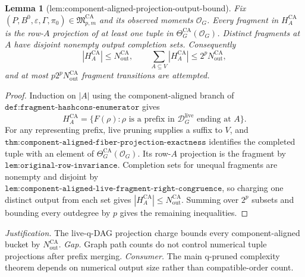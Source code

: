 \documentclass{article}
\newtheorem{lemma}{Lemma}
\begin{document}
\begin{lemma}[lem:component-aligned-projection-output-bound]\label{lem:component-aligned-projection-output-bound}
Fix \((P,B^0,\varepsilon,\Gamma,\pi_0)\in\mathfrak M_{p,m}^{\mathrm{CA}}\) and its observed moments \(\mathcal O_G\).  Every fragment in \(H_A^{\mathrm{CA}}\) is the row-\(A\) projection of at least one tuple in \(\Theta_G^{\mathrm{CA}}(\mathcal O_G)\).  Distinct fragments at \(A\) have disjoint nonempty output completion sets.  Consequently
\[
 |H_A^{\mathrm{CA}}|\le N_{\mathrm{out}}^{\mathrm{CA}},
 \qquad
 \sum_{A\subseteq V}|H_A^{\mathrm{CA}}|
 \le2^pN_{\mathrm{out}}^{\mathrm{CA}},
\]
and at most \(p2^pN_{\mathrm{out}}^{\mathrm{CA}}\) fragment transitions are attempted.
\end{lemma}
\begin{proof}
Induction on \(|A|\) using the component-aligned branch of \(\texttt{def:fragment-hashcons-enumerator}\) gives
\[
 H_A^{\mathrm{CA}}
 =\{F(\rho):\rho\text{ is a prefix in }
 \mathcal D_G^{\mathrm{live}}\text{ ending at }A\}.
\]
For any representing prefix, live pruning supplies a suffix to \(V\), and \(\texttt{thm:component-aligned-fiber-projection-exactness}\) identifies the completed tuple with an element of \(\Theta_G^{\mathrm{CA}}(\mathcal O_G)\).  Its row-\(A\) projection is the fragment by \(\texttt{lem:original-row-invariance}\).  Completion sets for unequal fragments are nonempty and disjoint by \(\texttt{lem:component-aligned-live-fragment-right-congruence}\), so charging one distinct output from each set gives \(|H_A^{\mathrm{CA}}|\le N_{\mathrm{out}}^{\mathrm{CA}}\).  Summing over \(2^p\) subsets and bounding every outdegree by \(p\) gives the remaining inequalities.
\end{proof}
\par\smallskip\noindent \textit{Justification.} The live-q-DAG projection charge bounds every component-aligned bucket by \(N_{\mathrm{out}}^{\mathrm{CA}}\). \textit{Gap.} Graph path counts do not control numerical tuple projections after prefix merging. \textit{Consumer.} The main q-pruned complexity theorem depends on numerical output size rather than compatible-order count.
\end{document}
